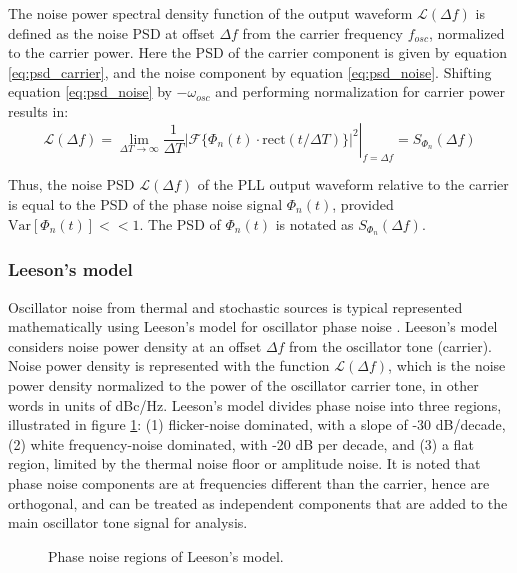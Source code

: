 		 The noise power spectral density function of the output waveform $\mathcal{L}(\Delta f)$ is defined as the noise PSD at offset $\Delta f$ from the carrier frequency $f_{osc}$, normalized to the carrier power. Here the PSD of the carrier component is given by equation \ref{eq:psd_carrier}, and the noise component by equation \ref{eq:psd_noise}. Shifting equation \ref{eq:psd_noise} by $-\omega_{osc}$ and performing normalization for carrier power results in:
		\begin{equation}\label{eq:pn_psd_relation}
			\mathcal{L}(\Delta f) = \left.\lim_{\Delta T\rightarrow\infty}\frac{1}{\Delta T}|\mathcal{F}\{\Phi_{n}(t)\cdot\mathrm{rect}(t/\Delta T)\}|^2 \right|_{f=\Delta f}= S_{\Phi_{n}}(\Delta f)
		\end{equation}

		Thus, the noise PSD $\mathcal{L}(\Delta f)$ of the PLL output waveform relative to the carrier is equal to the PSD of the phase noise signal $\Phi_{n}(t)$, provided $\text{Var}[\Phi_{n}(t)] << 1$. The PSD of $\Phi_{n}(t)$ is notated as $S_{\Phi_{n}}(\Delta f)$.


	\subsubsection{Leeson's model}\label{dco_noise}
		Oscillator noise from thermal and stochastic sources is typical represented mathematically using Leeson's model for oscillator phase noise \cite{leeson_1966}. Leeson's model considers noise power density at an offset $\Delta f$ from the oscillator tone (carrier). Noise power density is represented with the function $\mathcal{L}(\Delta f)$, which is the noise power density normalized to the power of the oscillator carrier tone, in other words in units of dBc/Hz. Leeson's model divides phase noise into three regions, illustrated in figure \ref{fig:leeson_pn}: (1) flicker-noise dominated, with a slope of -30 dB/decade, (2) white frequency-noise dominated, with -20 dB per decade, and (3) a flat region, limited by the thermal noise floor or amplitude noise. It is noted that phase noise components are at frequencies different than the carrier, hence are orthogonal, and can be treated as independent components that are added to the main oscillator tone signal for analysis. 

			\begin{figure}[htb!]
		        \centering
		        
			    \caption{Phase noise regions of Leeson's model.}
			    \label{fig:leeson_pn}
			\end{figure}


